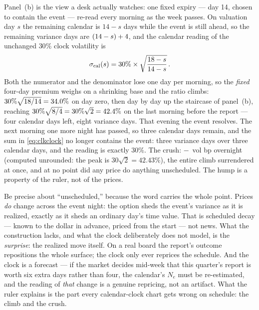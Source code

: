 Panel~(b) is the view a desk actually watches: one fixed expiry ---
day 14, chosen to contain the event --- re-read every morning as the
week passes.  On valuation day $s$ the remaining calendar is $14-s$
days while the event is still ahead, so the remaining variance days
are $(14-s)+4$, and the calendar reading of the
unchanged $30\%$ clock volatility is
\[
\sigma_{\rm cal}(s)
=30\%\times\sqrt{\frac{18-s}{14-s}}\,.
\]
Both the numerator and the denominator lose one day per morning, so
the \emph{fixed} four-day premium weighs on a shrinking base and the
ratio climbs: $30\%\sqrt{18/14}=34.0\%$ on day
zero, then day by day up the staircase of panel~(b), reaching
$30\%\sqrt{8/4}=30\%\sqrt{2}=42.4\%$ on the last
morning before the report --- four calendar days left, eight variance
days.  That evening the event resolves.  The next morning one more
night has passed, so three calendar days remain, and the sum in
\eqref{eq:clkclock} no longer contains the event: three variance days
over three calendar days, and the reading is exactly $30\%$.  The
crush: $-$\MacClkCrushDropBp\ vol bp
overnight (computed unrounded: the peak is $30\sqrt2=42.43\%$), the
entire climb surrendered at once, and at no point did any price do
anything unscheduled.  The hump is a property of the ruler, not of
the prices.

Be precise about ``unscheduled,'' because the word carries the whole
point.  Prices \emph{do} change across the event night: the option
sheds the event's variance as it is realized, exactly as it sheds an
ordinary day's time value.  That is scheduled decay --- known to the
dollar in advance, priced from the start --- not news.  What the
construction lacks, and what the clock deliberately does not model,
is the \emph{surprise}: the realized move itself.  On a real board
the report's outcome repositions the whole surface; the clock only
ever reprices the schedule.  And the clock is a forecast --- if the
market decides mid-week that this quarter's report is worth six
extra days rather than four, the calendar's $N_e$ must be
re-estimated, and the reading of \emph{that} change is a genuine
repricing, not an artifact.  What the ruler explains is the part
every calendar-clock chart gets wrong on schedule: the climb and the
crush.

